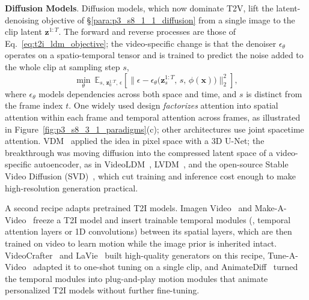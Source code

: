 \noindent \textbf{Diffusion Models}. Diffusion models, which now dominate T2V, lift the latent-denoising objective of §\ref{para:p3_s8_1_1_diffusion} from a single image to the clip latent $\mathbf{z}^{1:T}$. The forward and reverse processes are those of Eq.~\eqref{eq:t2i_ldm_objective}; the video-specific change is that the denoiser $\epsilon_\theta$ operates on a spatio-temporal tensor and is trained to predict the noise added to the whole clip at sampling step $s$,
\begin{equation}
\min_\theta\ \mathbb{E}_{s,\,\mathbf{z}_0^{1:T},\,\epsilon}\!\left[\big\|\epsilon-\epsilon_\theta\!\big(\mathbf{z}_s^{1:T},\,s,\,\phi(\mathbf{x})\big)\big\|_2^2\right],
\label{eq:p3_s8_3_1_diff}
\end{equation}
where $\epsilon_\theta$ models dependencies across both space and time, and $s$ is distinct from the frame index $t$. One widely used design \emph{factorizes} attention into spatial attention within each frame and temporal attention across frames, as illustrated in Figure~\ref{fig:p3_s8_3_1_paradigms}(c); other architectures use joint spacetime attention.
VDM~\cite{ho2022video} applied the idea in pixel space with a 3D U-Net; the breakthrough was moving diffusion into the compressed latent space of a video-specific autoencoder, as in VideoLDM~\cite{blattmann2023align}, LVDM~\cite{he2022latent}, and the open-source Stable Video Diffusion (SVD)~\cite{blattmann2023stable}, which cut training and inference cost enough to make high-resolution generation practical.

A second recipe adapts pretrained T2I models. Imagen Video~\cite{ho2022imagen} and Make-A-Video~\cite{singer2022make} freeze a T2I model and insert trainable temporal modules (\eg, temporal attention layers or 1D convolutions) between its spatial layers, which are then trained on video to learn motion while the image prior is inherited intact. VideoCrafter~\cite{chen2023videocrafter1,chen2024videocrafter2} and LaVie~\cite{wang2025lavie} built high-quality generators on this recipe, Tune-A-Video~\cite{wu2023tune} adapted it to one-shot tuning on a single clip, and AnimateDiff~\cite{guo2023animatediff} turned the temporal modules into plug-and-play motion modules that animate personalized T2I models without further fine-tuning.

